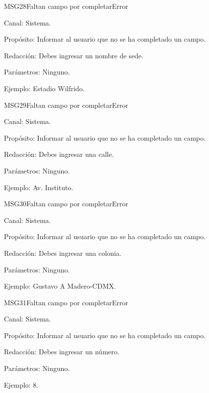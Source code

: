 \begin{mensaje}{MSG28}{Faltan campo por completar}{Error}
	\item[Canal:] Sistema.
	\item[Propósito:] Informar al usuario que no se ha completado un campo.
	\item[Redacción:] Debes ingresar un nombre de sede.
	\item[Parámetros:] Ninguno.
	\item[Ejemplo:] Estadio Wilfrido.
\end{mensaje}
\newline


\begin{mensaje}{MSG29}{Faltan campo por completar}{Error}
	\item[Canal:] Sistema.
	\item[Propósito:] Informar al usuario que no se ha completado un campo.
	\item[Redacción:] Debes ingresar una calle.
	\item[Parámetros:] Ninguno.
	\item[Ejemplo:] Av. Instituto.
\end{mensaje}
\newline


\begin{mensaje}{MSG30}{Faltan campo por completar}{Error}
	\item[Canal:] Sistema.
	\item[Propósito:] Informar al usuario que no se ha completado un campo.
	\item[Redacción:] Debes ingresar una colonia.
	\item[Parámetros:] Ninguno.
	\item[Ejemplo:] Gustavo A Madero-CDMX.
\end{mensaje}
\newline


\begin{mensaje}{MSG31}{Faltan campo por completar}{Error}
	\item[Canal:] Sistema.
	\item[Propósito:] Informar al usuario que no se ha completado un campo.
	\item[Redacción:] Debes ingresar un número.
	\item[Parámetros:] Ninguno.
	\item[Ejemplo:] 8.
\end{mensaje}
\newline


